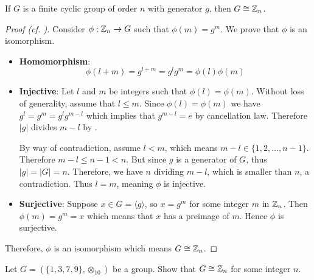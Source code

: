 \begin{theorem}\label{thrm-finite-cyclic-group-isomorphic-to-Zn}
    If $G$ is a finite cyclic group of order $n$ with generator $g$, then $G \cong \mathbb{Z}_n$.
\end{theorem}
\begin{proof}[Proof (cf. {\cite[\S 63]{clark_1984}})]
    Consider $\phi: \mathbb{Z}_n \to G$ such that $\phi(m) = g^m$. We prove that $\phi$ is an isomorphism.
    \begin{itemize}
        \item \textbf{Homomorphism}:
        \[
            \phi(l+m) = g^{l+m} = g^lg^m = \phi(l)\phi(m)
        \]

        \item \textbf{Injective}: Let $l$ and $m$ be integers such that $\phi(l) = \phi(m)$. Without loss of generality, assume that $l \leq m$. Since $\phi(l) = \phi(m)$ we have $g^l = g^m = g^lg^{m-l}$ which implies that $g^{m-l} = e$ by cancellation law. Therefore $|g|$ divides $m-l$ by .

        By way of contradiction, assume $l < m$, which means $m - l \in \{1, 2,\dots, n-1\}$. Therefore $m-l \leq n - 1 < n$. But since $g$ is a generator of $G$, thus $|g| = |G| = n$. Therefore, we have $n$ dividing $m-l$, which is smaller than $n$, a contradiction. Thus $l = m$, meaning $\phi$ is injective.

        \item \textbf{Surjective}: Suppose $x \in G = \langle g\rangle$, so $x = g^m$ for some integer $m$ in $\mathbb{Z}_n$. Then $\phi(m) = g^m = x$ which means that $x$ has a preimage of $m$. Hence $\phi$ is surjective.
    \end{itemize}

    Therefore, $\phi$ is an isomorphism which means $G \cong \mathbb{Z}_n$.
\end{proof}


\begin{exercise}
    Let $G = (\{1, 3, 7, 9\}, \otimes_{10})$ be a group. Show that $G \cong \mathbb{Z}_n$ for some integer $n$.
\end{exercise}

